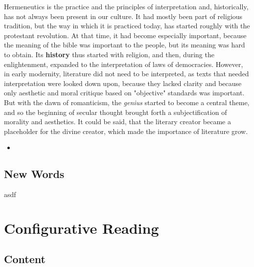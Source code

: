 \documentclass[]{scrartcl}
\begin{document}
Hermeneutics is the practice and the principles of interpretation and, historically, has not always been present in our culture. It had mostly been part of religious tradition, but the way in which it is practiced today, has started roughly with the protestant revolution. At that time, it had become especially important, because the meaning of the bible was important to the people, but its meaning was hard to obtain. Its \textbf{history} thus started with religion, and then, during the enlightenment, expanded to the interpretation of laws of democracies. However, in early modernity, literature did not need to be interpreted, as texts that needed interpretation were looked down upon, because they lacked clarity and because only aesthetic and moral critique based on "objective" standards was important. But with the dawn of romanticism, the \emph{genius} started to become a central theme, and so the beginning of secular thought brought forth a subjectification of morality and aesthetics. It could be said, that the literary creator became a placeholder for the divine creator, which made the importance of literature grow.

\begin{itemize}
\item 
\end{itemize}


\subsection{New Words}

\begin{description}[leftmargin=!,labelwidth=\widthof{\bfseries Cartesian Revolution}]
  \item[Literature] asdf
\end{description}

\section{Configurative Reading}

\vspace{15pt}


\subsection{Content}
\end{document}
